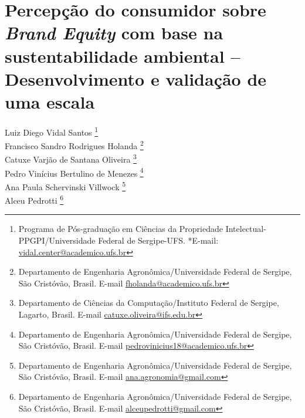 \chapter{Percepção do consumidor sobre \textit{Brand Equity} com base na sustentabilidade ambiental – Desenvolvimento e validação de uma escala}


\begin{flushright}
Luiz Diego Vidal Santos  \footnote[1]{Programa de Pós-graduação em Ciências da Propriedade Intelectual-PPGPI/Universidade Federal de Sergipe-UFS. *E-mail:  \href{mailto:vidal.center@academico.ufs.br}{vidal.center@academico.ufs.br}}
\\[0.2cm] 
Francisco Sandro Rodrigues Holanda \footnote[2]{Departamento de Engenharia Agronômica/Universidade Federal de Sergipe, São Cristóvão, Brasil. E-mail \href{mailto:fholanda@academico.ufs.br}{fholanda@academico.ufs.br}}
\\[0.2cm] 
Catuxe Varjão de Santana Oliveira \footnote[3]{Departamento de Ciências da Computação/Instituto Federal de Sergipe, Lagarto, Brasil. E-mail \href{mailto:catuxe.oliveira@ifs.edu.br}{catuxe.oliveira@ifs.edu.br}}
\\[0.2cm] 
Pedro Vinícius Bertulino de Menezes \footnote[2]{Departamento de Engenharia Agronômica/Universidade Federal de Sergipe, São Cristóvão, Brasil. E-mail \href{mailto:pedrovinicius18@academico.ufs.br}{pedrovinicius18@academico.ufs.br}}
\\[0.2cm] 
Ana Paula Schervinski Villwock \footnote[2]{Departamento de Engenharia Agronômica/Universidade Federal de Sergipe, São Cristóvão, Brasil. E-mail \href{mailto:ana.agronomia@gmail.com}{ana.agronomia@gmail.com}}
\\[0.2cm] 
Alceu Pedrotti \footnote[2]{Departamento de Engenharia Agronômica/Universidade Federal de Sergipe, São Cristóvão, Brasil. E-mail \href{mailto:alceupedrotti@gmail.com}{alceupedrotti@gmail.com}}
\end{flushright}

